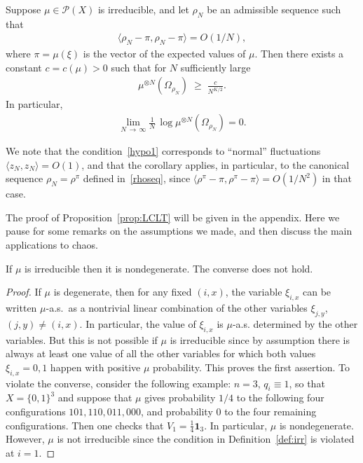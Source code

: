 \documentclass[AHL,Unicode,longabstracts,published]{cedram}
\renewcommand{\geq}{\;\geqslant\;}
\newcommand{\Om}{\Omega}
\newcommand{\scalar}[2]{\langle #1, #2\rangle}
\newcommand{\ind}{\mathbf{1}}
\newcommand{\cP}{\mathcal{P}}
\let\r=\rho
\begin{document}
\begin{coro}\label{coro2}
Suppose $\mu\in\cP(X)$ is irreducible, and let $\r_N$ be an admissible sequence such that
\begin{align}\label{hypo1}
\scalar{\r_N-\pi}{\r_N-\pi} =O(1/N),
\end{align}
where $\pi = \mu(\xi)$ is the vector of the expected values of $\mu$. Then there exists a constant $c=c(\mu)>0$ such that for $N$ sufficiently large
\begin{align}\label{lim1}
\mu^{\otimes N}\left(\Om_{\r_N}\right)\geq \frac{c}{N^{K/2}}.
\end{align}
In particular,
\begin{align}\label{loglim}
\lim_{N\,\to\,\infty} \frac1N\,\log
\mu^{\otimes N}\left(\Om_{\r_N}\right)= 0.
\end{align}
\end{coro}

We note that the condition~\eqref{hypo1} corresponds to ``normal'' fluctuations $\scalar{z_N}{z_N} = O(1)$, and that the corollary applies, in particular, to the canonical sequence $\rho_N=\r^\pi$ defined in~\eqref{rhoseq}, since $\scalar{\r^\pi-\pi}{\r^\pi-\pi} =O(1/N^2)$ in that case.

The proof of Proposition~\ref{prop:LCLT} will be given in the appendix. Here we pause for some remarks on the assumptions we made, and then discuss the main applications to chaos.

\begin{lemm}\label{lem:nondeg}
If $\mu$ is irreducible then it is nondegenerate. The converse does not hold.
\end{lemm}

\begin{proof}
If $\mu$ is degenerate, then for any fixed $(i,x)$, the variable $\xi_{i,x}$ can be written $\mu$-a.s.\ as a nontrivial linear combination of the other variables $\xi_{j,y}$, $(j,y)\neq (i,x)$. In particular, the value of $\xi_{i,x}$ is $\mu$-a.s.  determined by the other variables. But this is not possible if $\mu$ is irreducible since by assumption there is always at least one value of all the other variables for which both values $\xi_{i,x}=0,1$ happen with positive $\mu$ probability. This proves the first assertion. To violate the converse, consider the following example: $n=3$, $q_i\equiv1$, so that $X=\{0,1\}^3$ and suppose that $\mu$ gives probability $1/4$ to the following four configurations $101,110,011,000$, and probability 0 to the four remaining configurations. Then one checks that $V_1=\frac14\ind_3$. In particular, $\mu$ is nondegenerate. However, $\mu$ is not irreducible since the condition in Definition~\ref{def:irr} is violated at $i=1$.
\end{proof}
\end{document}
